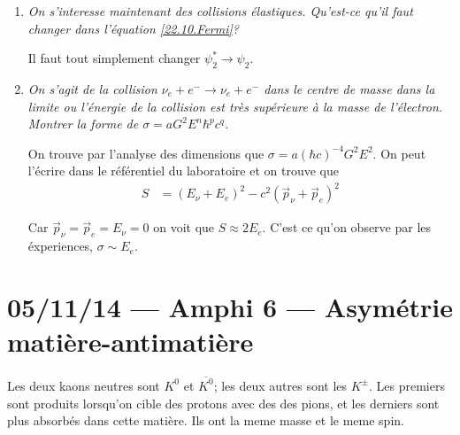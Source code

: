 \documentclass[10pt]{report}
\begin{document}
\begin{enumerate}[1.]
        Mais pour l'instant on a une d\'ependence sur $L^6$. La r\'esolution de cette dilemme est qu'il faut prendre la somme de toutes les $\vec{p}_{2,3,4}$, comme $\Gamma = \sum\limits_{\vec{p}_{2,3,4}}^{}\frac{p_{fi}}{T}$. Rappelons qu'on a un delta de Kronecker dans l'expression $p_{fi}$ et alors on peut faire $\sum\limits_{\vec{p}_{2,3,4}}^{}\delta_{\vec{p},0} \to \sum\limits_{\vec{p}_{2,3}}^{}$ car la somme est fix\'ee par le delta.

        Car on veut prendre la limite $L \to \infty$ on remplace la somme par l'integrale $\sum\limits_{\vec{p}_{2,3}}^{} \to \left( \frac{L}{2\pi \hbar} \right)^6 \int\limits d^3\vec{p}_{2,3}$ et finalement onobtient
        \begin{align}
            \Gamma &= \frac{2\pi G^2}{\hbar} \int \frac{d^3\vec{p}_2d^3\vec{p}_3}{\left( 2\pi \hbar \right)^6}\delta\left( E_2 + E_3 + E_4 - E_1 \right)
        \end{align}

    \item \emph{On s'interesse maintenant des collisions \'elastiques. Qu'est-ce qu'il faut changer dans l'\'equation \eqref{22.10.Fermi}?}

        Il faut tout simplement changer $\psi_2^* \to \psi_2$. 

    \item \emph{On s'agit de la collision $\nu_e + e^- \to \nu_e + e^-$ dans le centre de masse dans la limite ou l'\'energie de la collision est tr\`es sup\'erieure \`a la masse de l'\'electron. Montrer la forme de $\sigma = aG^2E^n\hbar^pc^q$.}

        On trouve par l'analyse des dimensions que $\sigma = a \left( \hbar c \right)^{-4} G^2 E^2$. On peut l'\'ecrire dans le r\'ef\'erentiel du laboratoire et on trouve que
        \begin{align}
            S &= \left( E_\nu + E_e \right)^2 - c^2\left( \vec{p}_\nu + \vec{p}_e \right)^2
        \end{align}

        Car $\vec{p}_\nu = \vec{p}_e = E_\nu = 0$ on voit que $S \approx 2E_e$. C'est ce qu'on observe par les \'experiences, $\sigma \sim E_e$. 
\end{enumerate}
\chapter{05/11/14 --- Amphi 6 --- Asym\'etrie mati\`ere-antimati\`ere}

Les deux kaons neutres sont $K^0$ et $\overline{K^0}$; les deux autres sont les $K^{\pm}$. Les premiers sont produits lorsqu'on cible des protons avec des des pions, et les derniers sont plus absorb\'es dans cette mati\`ere. Ils ont la meme masse et le meme spin.
\end{document}
